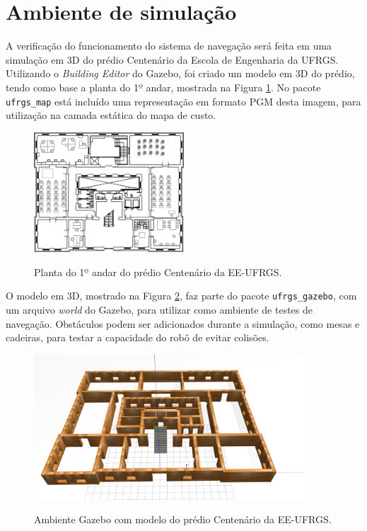 \documentclass[repeatfields,xlists,xpacks,oneside,yearsonly]{ufrgscca}
\begin{document}
\section{Ambiente de simulação}

A verificação do funcionamento do sistema de navegação será feita em uma simulação
em 3D do prédio Centenário da Escola de Engenharia da UFRGS.
Utilizando o \textit{Building Editor} do Gazebo, foi criado um modelo em 3D do prédio,
tendo como base a planta do 1º andar, mostrada na Figura \ref{fig:planta_centenario}.
No pacote \texttt{ufrgs\_map} está incluído uma representação em formato PGM desta
imagem, para utilização na camada estática do mapa de custo.

\begin{figure}[htbp]
    {
        \centering
        \caption{Planta do 1º andar do prédio Centenário da EE-UFRGS.}
        \label{fig:planta_centenario}
        \includegraphics[width=0.5\textwidth]{centenario_floor_plan.png}\\
    }
    {}
\end{figure}

O modelo em 3D, mostrado na Figura \ref{fig:gazebo_centenario}, faz parte do pacote
\texttt{ufrgs\_gazebo}, com um arquivo \textit{world} do Gazebo,
para utilizar como ambiente de testes de navegação.
Obstáculos podem ser adicionados durante a simulação, como mesas e cadeiras,
para testar a capacidade do robô de evitar colisões.

\begin{figure}[htbp]
    {
        \centering
        \caption{Ambiente Gazebo com modelo do prédio Centenário da EE-UFRGS.}
        \label{fig:gazebo_centenario}
        \includegraphics[width=0.9\textwidth]{gazebo.png}\\
    }
    {}
\end{figure}
\end{document}
